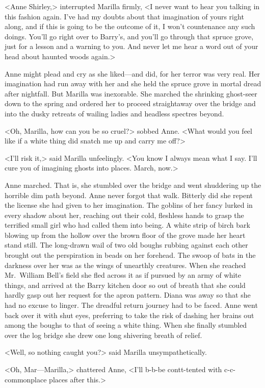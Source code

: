 <Anne Shirley,> interrupted Marilla firmly, <I never want to hear you talking in this fashion again. I've had my doubts about that imagination of yours right along, and if this is going to be the outcome of it, I won't countenance any such doings. You'll go right over to Barry's, and you'll go through that spruce grove, just for a lesson and a warning to you. And never let me hear a word out of your head about haunted woods again.>

Anne might plead and cry as she liked—and did, for her terror was very real. Her imagination had run away with her and she held the spruce grove in mortal dread after nightfall. But Marilla was inexorable. She marched the shrinking ghost-seer down to the spring and ordered her to proceed straightaway over the bridge and into the dusky retreats of wailing ladies and headless spectres beyond.

<Oh, Marilla, how can you be so cruel?> sobbed Anne. <What would you feel like if a white thing did snatch me up and carry me off?>

<I'll risk it,> said Marilla unfeelingly. <You know I always mean what I say. I'll cure you of imagining ghosts into places. March, now.>

Anne marched. That is, she stumbled over the bridge and went shuddering up the horrible dim path beyond. Anne never forgot that walk. Bitterly did she repent the license she had given to her imagination. The goblins of her fancy lurked in every shadow about her, reaching out their cold, fleshless hands to grasp the terrified small girl who had called them into being. A white strip of birch bark blowing up from the hollow over the brown floor of the grove made her heart stand still. The long-drawn wail of two old boughs rubbing against each other brought out the perspiration in beads on her forehead. The swoop of bats in the darkness over her was as the wings of unearthly creatures. When she reached Mr.~William Bell's field she fled across it as if pursued by an army of white things, and arrived at the Barry kitchen door so out of breath that she could hardly gasp out her request for the apron pattern. Diana was away so that she had no excuse to linger. The dreadful return journey had to be faced. Anne went back over it with shut eyes, preferring to take the risk of dashing her brains out among the boughs to that of seeing a white thing. When she finally stumbled over the log bridge she drew one long shivering breath of relief.

<Well, so nothing caught you?> said Marilla unsympathetically.

<Oh, Mar—Marilla,> chattered Anne, <I'll b-b-be contt-tented with c-c-commonplace places after this.>